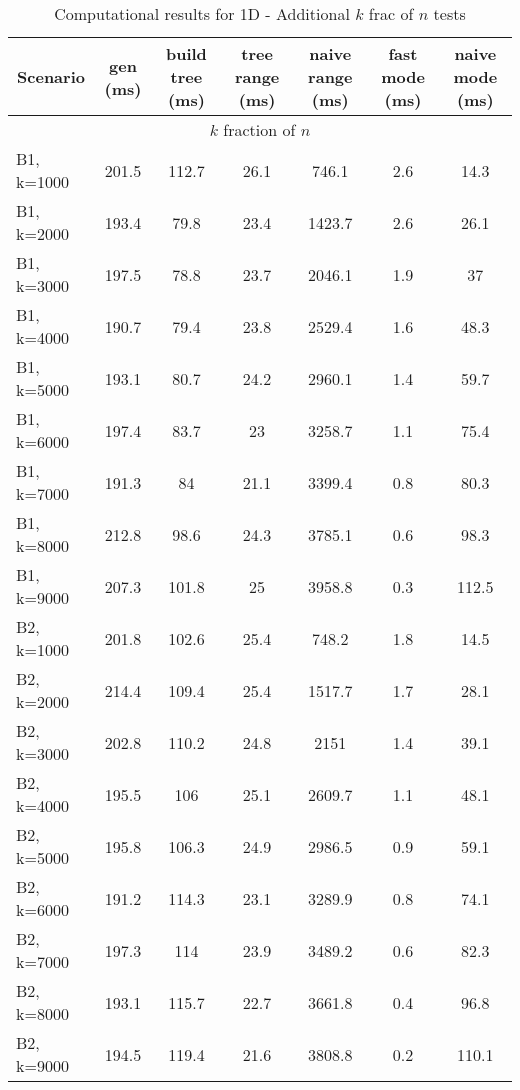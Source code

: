 \documentclass{article}
\begin{document}
\begin{center}
\begin{table}[h]
    \hskip0.8cm
    \begin{tabular}{|l||c|c|c|c|c|c|}
    \hline
    \multicolumn{1}{|c|}{Scenario} & gen (ms) & build tree (ms) & tree range (ms) & naive range (ms) & fast mode (ms) & naive mode (ms) \\
    \hline
    \hline
     \multicolumn{7}{|c|}{$k$ fraction of $n$} \\
    \hline
    B1, k=1000 & 201.5 & 112.7 & 26.1 & 746.1 & 2.6 & 14.3\\
    B1, k=2000 & 193.4 & 79.8 & 23.4 & 1423.7 & 2.6 & 26.1\\
    B1, k=3000 & 197.5 & 78.8 & 23.7 & 2046.1 & 1.9 & 37\\
    B1, k=4000 & 190.7 & 79.4 & 23.8 & 2529.4 & 1.6 & 48.3\\
    B1, k=5000 & 193.1 & 80.7 & 24.2 & 2960.1 & 1.4 & 59.7\\
    B1, k=6000 & 197.4 & 83.7 & 23 & 3258.7 & 1.1 & 75.4\\
    B1, k=7000 & 191.3 & 84 & 21.1 & 3399.4 & 0.8 & 80.3\\
    B1, k=8000 & 212.8 & 98.6 & 24.3 & 3785.1 & 0.6 & 98.3\\
    B1, k=9000 & 207.3 & 101.8 & 25 & 3958.8 & 0.3 & 112.5\\
    \hline
    B2, k=1000 & 201.8 & 102.6 & 25.4 & 748.2 & 1.8 & 14.5\\
    B2, k=2000 & 214.4 & 109.4 & 25.4 & 1517.7 & 1.7 & 28.1\\
    B2, k=3000 & 202.8 & 110.2 & 24.8 & 2151 & 1.4 & 39.1\\
    B2, k=4000 & 195.5 & 106 & 25.1 & 2609.7 & 1.1 & 48.1\\
    B2, k=5000 & 195.8 & 106.3 & 24.9 & 2986.5 & 0.9 & 59.1\\
    B2, k=6000 & 191.2 & 114.3 & 23.1 & 3289.9 & 0.8 & 74.1\\
    B2, k=7000 & 197.3 & 114 & 23.9 & 3489.2 & 0.6 & 82.3\\
    B2, k=8000 & 193.1 & 115.7 & 22.7 & 3661.8 & 0.4 & 96.8\\
    B2, k=9000 & 194.5 & 119.4 & 21.6 & 3808.8 & 0.2 & 110.1\\
    \hline
    \end{tabular}
    \caption{Computational results for 1D - Additional $k$ frac of $n$ tests}
    \label{tab:1d_res_additional}
\end{table}
\end{center}
\end{document}
